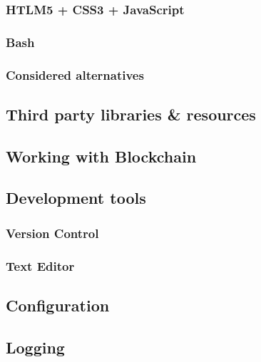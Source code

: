 \subsubsection{HTLM5 + CSS3 + JavaScript}
\subsubsection{Bash}

\subsubsection{Considered alternatives}

\subsection{Third party libraries \& resources}

\subsection{Working with Blockchain}

\subsection{Development tools}
\subsubsection{Version Control}
\subsubsection{Text Editor}

\subsection{Configuration}

\subsection{Logging}

